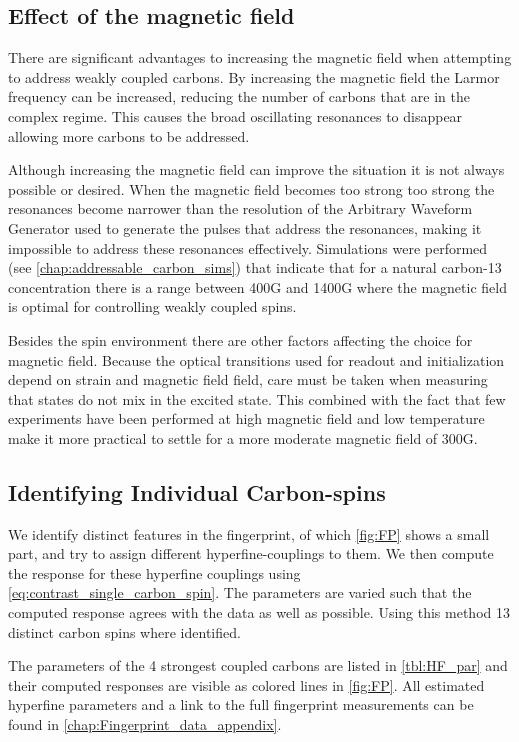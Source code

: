 \subsection{Effect of the magnetic field}

There are significant advantages to increasing the magnetic field when attempting to address weakly coupled carbons.
By increasing the magnetic field the Larmor frequency can be increased, reducing the number of carbons that are in the complex regime.
This causes the broad oscillating resonances to disappear allowing more carbons to be addressed.

Although increasing the magnetic field can improve the situation it is not always possible or desired.
When the magnetic field becomes too strong too strong the resonances become narrower than the resolution of the Arbitrary Waveform Generator used to generate the pulses that address the resonances, making it impossible to address these resonances effectively.
Simulations were performed (see \cref{chap:addressable_carbon_sims}) that indicate that for a natural carbon-13 concentration there is a range between 400G and 1400G where the magnetic field is optimal for controlling weakly coupled spins.

Besides the spin environment there are other factors affecting the choice for magnetic field.
Because the optical transitions used for readout and initialization depend on strain and magnetic field field\citep{Hensen2011MeasurementBased}, care must be taken when measuring that states do not mix in the excited state.
This combined with the fact that few experiments have been performed at high magnetic field and low temperature make it more practical to settle for a more moderate magnetic field of 300G.

\subsection{Identifying Individual Carbon-spins}

We identify distinct features in the fingerprint, of which \cref{fig:FP} shows a small part,  and try to assign different hyperfine-couplings to them.
We then compute the response for these hyperfine couplings using \cref{eq:contrast_single_carbon_spin}.
The parameters are varied such that the computed response agrees with the data as well as possible.
Using this method 13 distinct carbon spins where identified.

The parameters of the 4 strongest coupled carbons are listed in \cref{tbl:HF_par} and their computed responses are visible as colored lines in \cref{fig:FP}.
All estimated hyperfine parameters and a link to the full fingerprint measurements can be found in \cref{chap:Fingerprint_data_appendix}.

